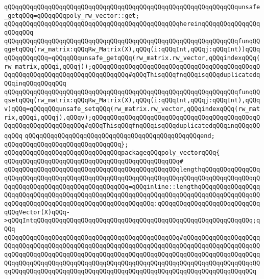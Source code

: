 \verb|qQQqqQQqqQQqqQQqqQQqqQQqqQQqqQQqqQQqqQQqqQQqqQQqqQQqqQQqqQQqqQQqunsafe_getqQQq=qQQqqQQqpoly_rw_vector::get;|\newline
\verb|qQQqqQQqqQQqqQQqqQQqqQQqqQQqqQQqqQQqqQQqqQQqqQQqhereinqQQqqQQqqQQqqQQqqQQqqQQq|\newline
\verb|qQQqqQQqqQQqqQQqqQQqqQQqqQQqqQQqqQQqqQQqqQQqqQQqqQQqqQQqqQQqqQQqfunqQQqgetqQQq(rw_matrix:qQQqRw_Matrix(X),qQQq(i:qQQqInt,qQQqj:qQQqInt))qQQqqQQqqQQqqQQq=qQQqqQQqunsafe_getqQQq(rw_matrix.rw_vector,qQQqindexqQQq(rw_matrix,qQQqi,qQQqj));qQQqqQQqqQQqqQQqqQQqqQQqqQQqqQQqqQQqqQQqqQQqqQQqqQQqqQQqqQQqqQQqqQQqqQQqqQQqqQQq#qQQqThisqQQqfnqQQqisqQQqduplicatedqQQqinqQQqqQQqqQQq|\newline
\verb|qQQqqQQqqQQqqQQqqQQqqQQqqQQqqQQqqQQqqQQqqQQqqQQqqQQqqQQqqQQqqQQqfunqQQqsetqQQq(rw_matrix:qQQqRw_Matrix(X),qQQq(i:qQQqInt,qQQqj:qQQqInt),qQQqv)qQQq=qQQqqQQqunsafe_setqQQq(rw_matrix.rw_vector,qQQqindexqQQq(rw_matrix,qQQqi,qQQqj),qQQqv);qQQqqQQqqQQqqQQqqQQqqQQqqQQqqQQqqQQqqQQqqQQqqQQqqQQqqQQqqQQqqQQqqQQq#qQQqThisqQQqfnqQQqisqQQqduplicatedqQQqinqQQqqQQqqQQq|\newline
\verb|qQQqqQQqqQQqqQQqqQQqqQQqqQQqqQQqqQQqqQQqqQQqqQQqend;|\newline
\verb|qQQqqQQqqQQqqQQqqQQqqQQqqQQqqQQq};|\newline
\newline
\verb|qQQqqQQqqQQqqQQqqQQqqQQqqQQqqQQqpackageqQQqpoly_vectorqQQq{|\newline
\verb|qQQqqQQqqQQqqQQqqQQqqQQqqQQqqQQqqQQqqQQqqQQqqQQq#|\newline
\verb|qQQqqQQqqQQqqQQqqQQqqQQqqQQqqQQqqQQqqQQqqQQqqQQqlengthqQQqqQQqqQQqqQQqqQQqqQQqqQQqqQQqqQQqqQQqqQQqqQQqqQQqqQQqqQQqqQQqqQQqqQQqqQQqqQQqqQQqqQQqqQQqqQQqqQQqqQQqqQQqqQQqqQQqqQQq=qQQqinline::lengthqQQqqQQqqQQqqQQqqQQqqQQqqQQqqQQqqQQqqQQqqQQqqQQqqQQqqQQqqQQqqQQqqQQqqQQqqQQqqQQqqQQqqQQqqQQqqQQqqQQqqQQqqQQqqQQqqQQqqQQqqQQqqQQq:qQQqqQQqqQQqqQQqqQQqqQQqqQQqqQQqVector(X)qQQq->qQQqIntqQQqqQQqqQQqqQQqqQQqqQQqqQQqqQQqqQQqqQQqqQQqqQQqqQQqqQQqqQQq;qQQq|\newline
\verb|qQQqqQQqqQQqqQQqqQQqqQQqqQQqqQQqqQQqqQQqqQQqqQQq#qQQqqQQqqQQqqQQqqQQqqQQqqQQqqQQqqQQqqQQqqQQqqQQqqQQqqQQqqQQqqQQqqQQqqQQqqQQqqQQqqQQqqQQqqQQqqQQqqQQqqQQqqQQqqQQqqQQqqQQqqQQqqQQqqQQqqQQqqQQqqQQqqQQqqQQqqQQqqQQqqQQqqQQqqQQqqQQqqQQqqQQqqQQqqQQqqQQqqQQqqQQqqQQqqQQqqQQqqQQqqQQqqQQqqQQqqQQqqQQqqQQqqQQqqQQqqQQqqQQqqQQqqQQqqQQqqQQqqQQqqQQqqQQqqQQqqQQqqQQq|\newline

